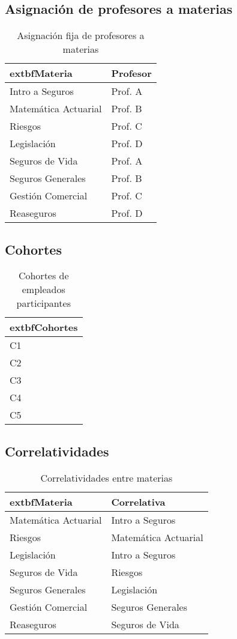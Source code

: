 \subsection*{Asignación de profesores a materias}
\begin{table}[ht]
\centering
\begin{tabular}{|l|l|}
\hline
	extbf{Materia} & \textbf{Profesor} \\
\hline
Intro a Seguros & Prof. A \\
Matemática Actuarial & Prof. B \\
Riesgos & Prof. C \\
Legislación & Prof. D \\
Seguros de Vida & Prof. A \\
Seguros Generales & Prof. B \\
Gestión Comercial & Prof. C \\
Reaseguros & Prof. D \\
\hline
\end{tabular}
\caption{Asignación fija de profesores a materias}
\end{table}

\subsection*{Cohortes}
\begin{table}[ht]
\centering
\begin{tabular}{|l|}
\hline
	extbf{Cohortes} \\
\hline
C1 \\
C2 \\
C3 \\
C4 \\
C5 \\
\hline
\end{tabular}
\caption{Cohortes de empleados participantes}
\end{table}

\subsection*{Correlatividades}
\begin{table}[ht]
\centering
\begin{tabular}{|l|l|}
\hline
	extbf{Materia} & \textbf{Correlativa} \\
\hline
Matemática Actuarial & Intro a Seguros \\
Riesgos & Matemática Actuarial \\
Legislación & Intro a Seguros \\
Seguros de Vida & Riesgos \\
Seguros Generales & Legislación \\
Gestión Comercial & Seguros Generales \\
Reaseguros & Seguros de Vida \\
\hline
\end{tabular}
\caption{Correlatividades entre materias}
\end{table}

